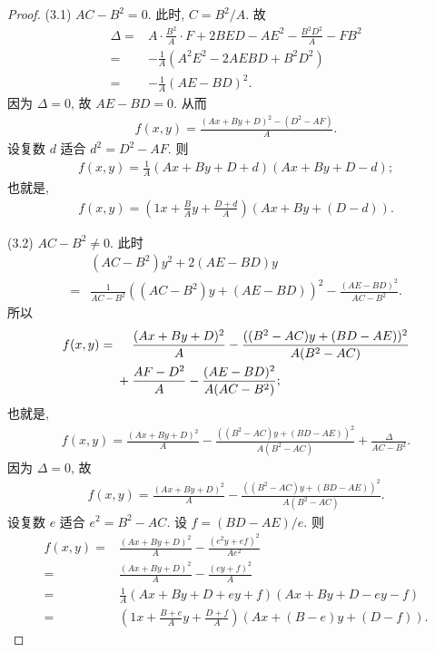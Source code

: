 \documentclass[../libro.tex]{subfiles}
\begin{document}
\begin{proof}
    (3.1)
    \(AC - B^2 = 0\).
    此时, \(C = B^2 / A\).
    故
    \begin{align*}
        \Delta
        = {} &
        A \cdot \frac{B^2}{A} \cdot F + 2BED - AE^2
        - \frac{B^2 D^2}{A} - FB^2
        \\
        = {} &
        {-} \frac{1}{A} (A^2 E^2 - 2AE BD + B^2 D^2)
        \\
        = {} &
        {-} \frac{1}{A} (AE - BD)^2.
    \end{align*}
    因为 \(\Delta = 0\),
    故 \(AE - BD = 0\).
    从而
    \begin{align*}
        f(x, y) = \frac{(Ax + By + D)^2 - (D^2 - AF)}{A}.
    \end{align*}
    设复数 \(d\) 适合 \(d^2 = D^2 - AF\).
    则
    \begin{align*}
        f(x, y) = \frac{1}{A} (Ax + By + D + d)(Ax + By + D - d);
    \end{align*}
    也就是,
    \begin{align*}
        f(x, y) = \left( 1x + \frac{B}{A} y + \frac{D+d}{A} \right) (Ax + By + (D - d)).
    \end{align*}

    (3.2)
    \(AC - B^2 \neq 0\).
    此时
    \begin{align*}
        & (AC - B^2) y^2 + 2(AE - BD)y
        \\
        = {} & \frac{1}{AC - B^2} ((AC - B^2)y + (AE - BD))^2 - \frac{(AE - BD)^2}{AC - B^2}.
    \end{align*}
    所以
    \begin{align*}
        f(x, y)
        = {} &
        \hphantom{{} + {}}
        \frac{(Ax + By + D)^2}{A} - \frac{((B^2 - AC)y + (BD - AE))^2}{A(B^2 - AC)}
        \\
        &
        + \frac{AF - D^2}{A} - \frac{(AE - BD)^2}{A(AC - B^2)};
    \end{align*}
    也就是,
    \begin{align*}
        f(x, y) = \frac{(Ax + By + D)^2}{A} - \frac{((B^2 - AC)y + (BD - AE))^2}{A(B^2 - AC)} + \frac{\Delta}{AC - B^2}.
    \end{align*}
    因为 \(\Delta = 0\), 故
    \begin{align*}
        f(x, y) = \frac{(Ax + By + D)^2}{A} - \frac{((B^2 - AC)y + (BD - AE))^2}{A(B^2 - AC)}.
    \end{align*}
    设复数 \(e\) 适合 \(e^2 = B^2 - AC\).
    设 \(f = (BD-AE)/e\).
    则
    \begin{align*}
        f(x, y)
        = {} & \frac{(Ax + By + D)^2}{A} - \frac{(e^2 y + ef)^2}{Ae^2}                   \\
        = {} & \frac{(Ax + By + D)^2}{A} - \frac{(ey + f)^2}{A}                          \\
        = {} & \frac{1}{A}(Ax + By + D + ey + f)(Ax + By + D - ey - f)                   \\
        = {} & \left( 1x + \frac{B+e}{A}y + \frac{D+f}{A} \right) (Ax + (B-e)y + (D-f)).
    \end{align*}


\end{proof}
\end{document}
